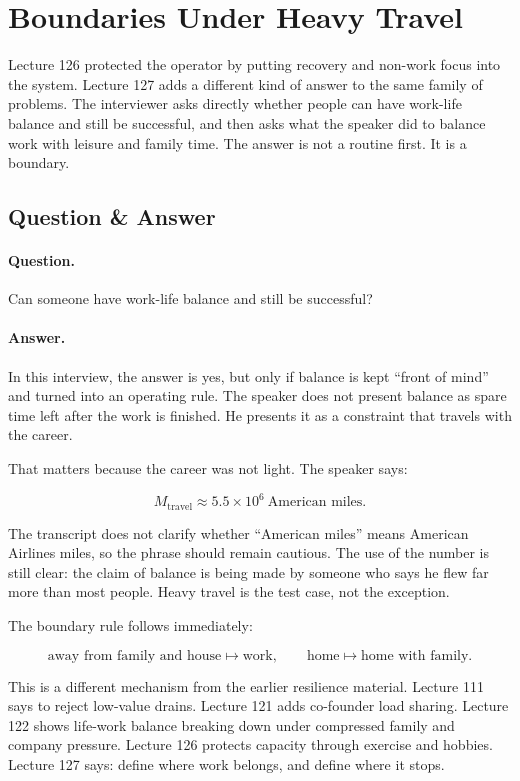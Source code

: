 \documentclass[11pt,oneside]{book}
\begin{document}
\section{Boundaries Under Heavy Travel}

Lecture 126 protected the operator by putting recovery and non-work focus into the system. Lecture 127 adds a different kind of answer to the same family of problems. The interviewer asks directly whether people can have work-life balance and still be successful, and then asks what the speaker did to balance work with leisure and family time. The answer is not a routine first. It is a boundary.

\subsection{Question \& Answer}

\paragraph{Question.}
Can someone have work-life balance and still be successful?

\paragraph{Answer.}
In this interview, the answer is yes, but only if balance is kept ``front of mind'' and turned into an operating rule. The speaker does not present balance as spare time left after the work is finished. He presents it as a constraint that travels with the career.

That matters because the career was not light. The speaker says:

\[
M_{\mathrm{travel}}
\approx
5.5\times 10^{6}\ \text{American miles}.
\]

The transcript does not clarify whether ``American miles'' means American Airlines miles, so the phrase should remain cautious. The use of the number is still clear: the claim of balance is being made by someone who says he flew far more than most people. Heavy travel is the test case, not the exception.

The boundary rule follows immediately:

\[
\text{away from family and house}
\longmapsto
\text{work},
\qquad
\text{home}
\longmapsto
\text{home with family}.
\]

This is a different mechanism from the earlier resilience material. Lecture 111 says to reject low-value drains. Lecture 121 adds co-founder load sharing. Lecture 122 shows life-work balance breaking down under compressed family and company pressure. Lecture 126 protects capacity through exercise and hobbies. Lecture 127 says: define where work belongs, and define where it stops.
\end{document}
